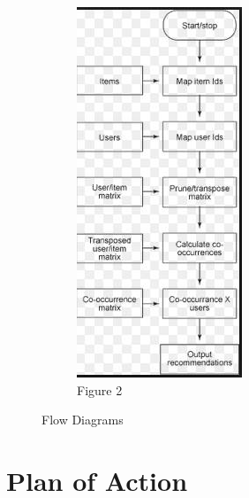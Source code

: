 \documentclass[12pt]{article} %
\begin{document}
\begin{figure}
\begin{subfigure}{.5\textwidth}
  \includegraphics[width=0.75\linewidth]{flow2.jpg}
  \caption{Figure 2}
  \label{fig:sub2}
\end{subfigure}
\caption{Flow Diagrams}
\label{fig:test}
\end{figure}

\section{Plan of Action}
\end{document}
